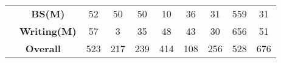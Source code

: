 \begin{table}[t]
{\begin{tabular}{cccccccccc}
            & \textbf{BS(M)}     & 52         & 50       & 50     & 10      & 36      & 31          & 559         & 31           \\
            & \textbf{Writing(M)} & 57         & 3        & 35     & 48      & 43      & 30          & 656         & 51           \\
            \midrule
            \multicolumn{2}{c}{\textbf{Overall}}                                                                           & 523        & 217      & 239    & 414     & 108     & 256         & 528         & 676                  \\
            \bottomrule
        \end{tabular}
    }
\end{table}
